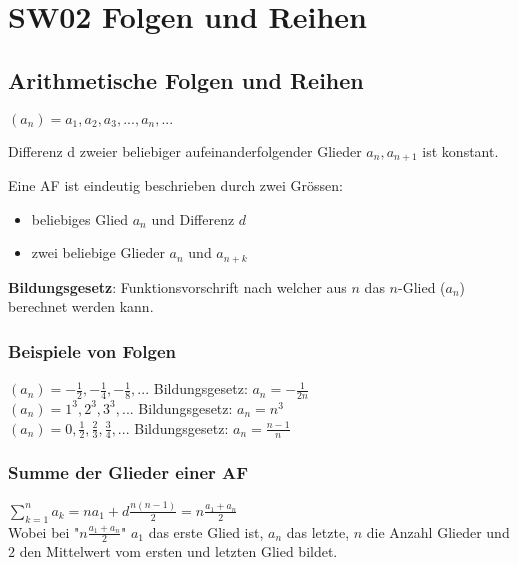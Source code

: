 \documentclass[../main.tex]{subfiles}
\begin{document}
\chapter{SW02 Folgen und Reihen}
\section{Arithmetische Folgen und Reihen}

$(a_n) = a_1,a_2,a_3,...,a_n,...$

\begin{flushleft}
Differenz d zweier beliebiger aufeinanderfolgender Glieder $a_n,a_{n+1}$ ist konstant.
\end{flushleft}

Eine AF ist eindeutig beschrieben durch zwei Grössen:
\begin{itemize}
    \item beliebiges Glied $a_n$ und Differenz $d$
    \item zwei beliebige Glieder $a_n$ und $a_{n+k}$
\end{itemize}

\begin{flushleft}
\textbf{Bildungsgesetz}: Funktionsvorschrift nach welcher aus $n$ das $n$-Glied ($a_n$) berechnet werden kann.
\end{flushleft}

\subsection{Beispiele von Folgen}
$(a_n) = -\frac{1}{2},-\frac{1}{4},-\frac{1}{8},...$ Bildungsgesetz: $a_n=-\frac{1}{2n}$ \\ [7pt]
$(a_n) = 1^3,2^3,3^3,...$ Bildungsgesetz: $a_n=n^3$ \\ [7pt]
$(a_n) = 0,\frac{1}{2},\frac{2}{3},\frac{3}{4},...$ Bildungsgesetz: $a_n=\frac{n-1}{n}$

\subsection{Summe der Glieder einer AF}
\begin{math}
    \sum\limits_{k=1}^n a_k = na_1 + d \frac{n(n-1)}{2} = n \frac{a_1 + a_n}{2}
\end{math} \\ [7pt]
Wobei bei "$n \frac{a_1 + a_n}{2}$" $a_1$ das erste Glied ist, $a_n$ das letzte, $n$ die Anzahl Glieder und $2$ den Mittelwert vom ersten und letzten Glied bildet.
\end{document}
